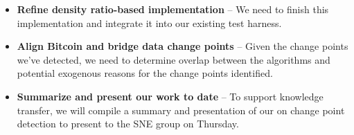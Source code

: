 \documentclass[10pt,letterpaper]{article}
\begin{document}
\begin{itemize}
\item \textbf{Refine density ratio-based implementation} -- We need to finish this implementation and integrate it into our existing test harness.
\item \textbf{Align Bitcoin and bridge data change points} -- Given the change points we've detected, we need to determine overlap between the algorithms and potential exogenous reasons for the change points identified.
\item \textbf{Summarize and present our work to date} -- To support knowledge transfer, we will compile a summary and presentation of our on change point detection to present to the SNE group on Thursday.
\end{itemize}

%
%
\end{document}
